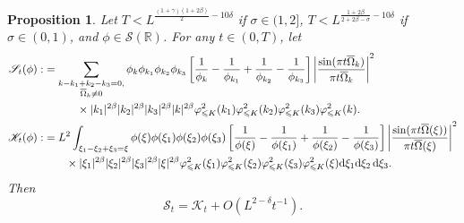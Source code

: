 \documentclass[UTF-8,reqno]{amsart}
\numberwithin{equation}{section}
\newtheorem{proposition}[theorem]{Proposition}
\theoremstyle{definition}
\def\dif{{\mathord{{\rm d}}}}
\def\leq{\leqslant}
\def\dif{{\mathord{{\rm d}}}}
\def\leq{\leqslant}
\begin{document}
\begin{proposition}
    \label{asymptotic}
Let $T  < L^{\frac{(1+\gamma)(1+2\beta)}{2}-10\delta}$ if $\sigma\in(1,2]$, $T  <L^{\frac{1+2\beta}{2+2\beta-\sigma}-10\delta} $ if $\sigma\in(0,1)$, and $\phi \in \mathcal{S}(\mathbb{R})$. 
For any $t \in (0,T)$, let   \begin{align*}
 \mathscr S_t(\phi):&=\sum\limits_{\substack{ k-k_1+k_2-k_3=0,\\ \overline \Omega_k\neq0}}\phi_k \phi_{k_1} \phi_{k_2} \phi_{k_3}  \left[ \frac{1}{\phi_k} - \frac{1}{\phi_{k_1}} + \frac{1}{\phi_{k_2}} - \frac{1}{\phi_{k_3}} \right]\left| \frac{\sin(\pi t\overline \Omega_k)}{\pi t \overline \Omega_k} \right|^2\notag\\
  &\quad\quad\quad\times
|k_1|^{2\beta}|k_2|^{2\beta}|k_3|^{2\beta}|k|^{2\beta}\varphi_{\leq K}^2(k_1)\varphi_{\leq K}^2(k_2)\varphi_{\leq K}^2(k_3)\varphi_{\leq K}^2(k).\\
\mathscr K_t(\phi):&=L^{2} \int_{\xi_1-\xi_2+\xi_3=\xi }\phi(\xi) \phi(\xi_1) \phi(\xi_2) \phi(\xi_3)  \left[ \frac{1}{\phi(\xi)} - \frac{1}{\phi(\xi_1)} + \frac{1}{\phi(\xi_2)} - \frac{1}{\phi(\xi_3)} \right]    \left| \frac{\sin(\pi t\overline \Omega( \xi))}{\pi t\overline\Omega( \xi)} \right|^2 \notag\\ &\quad\quad\times |\xi_1|^{2\beta}|\xi_2|^{2\beta}|\xi_3|^{2\beta}|\xi|^{2\beta}\varphi_{\leq K}^2(\xi_1)\varphi_{\leq K}^2(\xi_2)\varphi_{\leq K}^2(\xi_3)\varphi_{\leq K}^2(\xi)   \dif \xi_1  \dif\xi_2 \, \dif\xi_3.
\end{align*}
 Then
$$
\mathscr S_t=\mathscr K_t +O(L^{2-\delta} t^{-1}).
$$
\end{proposition}
\end{document}
